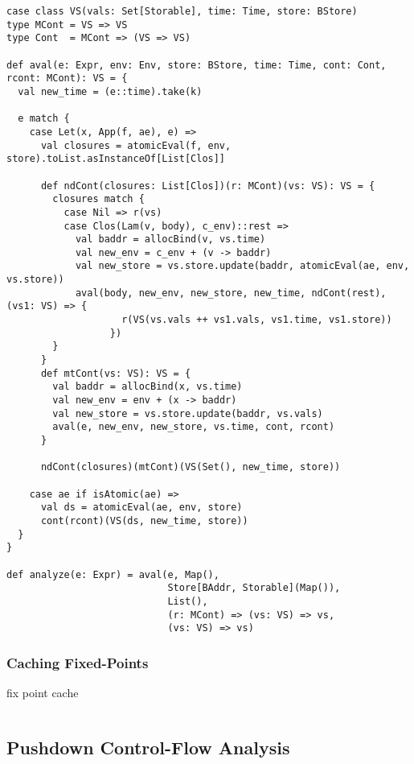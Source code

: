 \documentclass[acmsmall,review,anonymous]{acmart}\settopmatter{printfolios=true,printccs=false,printacmref=false}
\begin{document}
\begin{lstlisting}
case class VS(vals: Set[Storable], time: Time, store: BStore)
type MCont = VS => VS
type Cont  = MCont => (VS => VS)

def aval(e: Expr, env: Env, store: BStore, time: Time, cont: Cont, rcont: MCont): VS = {
  val new_time = (e::time).take(k)

  e match {
    case Let(x, App(f, ae), e) =>
      val closures = atomicEval(f, env, store).toList.asInstanceOf[List[Clos]]

      def ndCont(closures: List[Clos])(r: MCont)(vs: VS): VS = {
        closures match {
          case Nil => r(vs)
          case Clos(Lam(v, body), c_env)::rest =>
            val baddr = allocBind(v, vs.time)
            val new_env = c_env + (v -> baddr)
            val new_store = vs.store.update(baddr, atomicEval(ae, env, vs.store))
            aval(body, new_env, new_store, new_time, ndCont(rest), (vs1: VS) => {
                    r(VS(vs.vals ++ vs1.vals, vs1.time, vs1.store))
                  })
        }
      }
      def mtCont(vs: VS): VS = {
        val baddr = allocBind(x, vs.time)
        val new_env = env + (x -> baddr)
        val new_store = vs.store.update(baddr, vs.vals)
        aval(e, new_env, new_store, vs.time, cont, rcont)
      }

      ndCont(closures)(mtCont)(VS(Set(), new_time, store))

    case ae if isAtomic(ae) =>
      val ds = atomicEval(ae, env, store)
      cont(rcont)(VS(ds, new_time, store))
  }
}

def analyze(e: Expr) = aval(e, Map(),
                            Store[BAddr, Storable](Map()),
                            List(),
                            (r: MCont) => (vs: VS) => vs,
                            (vs: VS) => vs)

\end{lstlisting}

\subsubsection{Caching Fixed-Points}

fix point cache

\begin{lstlisting}
\end{lstlisting}

\subsection{Pushdown Control-Flow Analysis}
\end{document}
